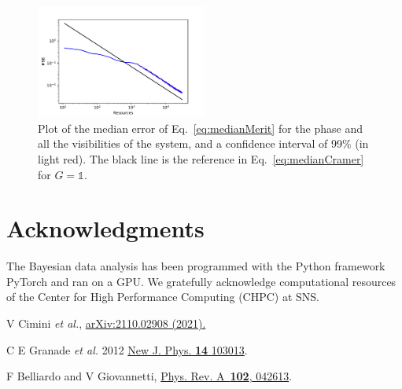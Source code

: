 \documentclass[aps, pra, 10pt, twocolumn, superscriptaddress,floatfix]{revtex4-1}
\def \id {\mathds{1}}
\begin{document}
\begin{figure}[!th]
	\begin{center}
		\includegraphics[width=0.5\textwidth]{phaseAndVisibilities/estimation1111111111.pdf}
	\end{center}
	\caption{Plot of the median error of Eq.~\eqref{eq:medianMerit} for the phase and all the visibilities of the system, and a confidence interval of 99\% (in light red). The black line is the reference in Eq.~\eqref{eq:medianCramer} for $G=\id$.}
	\label{fig:estimation11111}
\end{figure}
%

\section{Acknowledgments}
%
The Bayesian data analysis has been programmed with the Python framework PyTorch and ran on a GPU. We gratefully acknowledge computational resources of the Center for High Performance Computing (CHPC) at SNS.
	

\begin{thebibliography}{100}
	
	 V Cimini \textit{et al.}, \href{http://arxiv.org/abs/2110.02908}{arXiv:2110.02908 (2021).}
	
	 C E Granade \textit{et al.} 2012 \href{https://doi.org/10.1088/1367-2630/14/10/103013}{New J. Phys. {\bf 14} 103013}.
	
	
	 F Belliardo and V Giovannetti, \href{https://link.aps.org/doi/10.1103/PhysRevA.102.042613}{Phys. Rev. A~{\bf 102}, 042613}.
	

	
\end{thebibliography}
\end{document}

